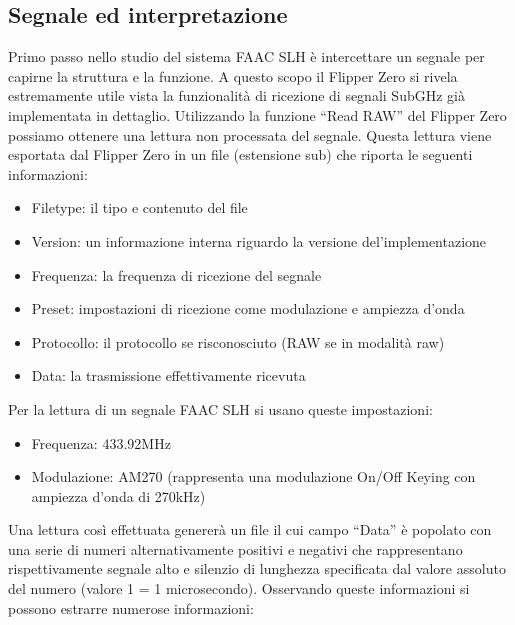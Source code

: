 \subsection{Segnale ed interpretazione}
\label{sub:signal}

Primo passo nello studio del sistema FAAC SLH è intercettare un segnale per capirne la struttura e la funzione. A questo scopo il Flipper Zero si rivela estremamente utile vista la funzionalità di ricezione di segnali SubGHz già implementata in dettaglio. Utilizzando la funzione “Read RAW” del Flipper Zero possiamo ottenere una lettura non processata del segnale. Questa lettura viene esportata dal Flipper Zero in un file (estensione sub) che riporta le seguenti informazioni:
\begin{itemize}
  \item Filetype: il tipo e contenuto del file
  \item Version: un informazione interna riguardo la versione del’implementazione
  \item Frequenza: la frequenza di ricezione del segnale
  \item Preset: impostazioni di ricezione come modulazione e ampiezza d’onda
  \item Protocollo: il protocollo se risconosciuto (RAW se in modalità raw)
  \item Data: la trasmissione effettivamente ricevuta
\end{itemize}
Per la lettura di un segnale FAAC SLH si usano queste impostazioni:
\begin{itemize}
  \item Frequenza: 433.92MHz
  \item Modulazione: AM270 (rappresenta una modulazione On/Off Keying con ampiezza d’onda di 270kHz)
\end{itemize}
Una lettura così effettuata genererà un file il cui campo “Data” è popolato con una serie di numeri alternativamente positivi e negativi che rappresentano rispettivamente segnale alto e silenzio di lunghezza specificata dal valore assoluto del numero (valore 1 = 1 microsecondo). Osservando queste informazioni si possono estrarre numerose informazioni:
